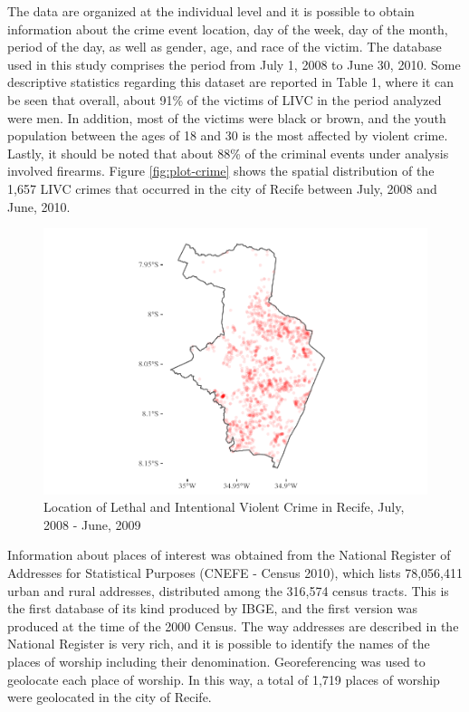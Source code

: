 \documentclass[smallextended]{svjour3}       %
\begin{document}
The data are organized at the individual level and it is possible to
obtain information about the crime event location, day of the week, day
of the month, period of the day, as well as gender, age, and race of the
victim. The database used in this study comprises the period from July
1, 2008 to June 30, 2010. Some descriptive statistics regarding this
dataset are reported in Table 1, where it can be seen that overall,
about 91\% of the victims of LIVC in the period analyzed were men. In
addition, most of the victims were black or brown, and the youth
population between the ages of 18 and 30 is the most affected by violent
crime. Lastly, it should be noted that about 88\% of the criminal events
under analysis involved firearms. Figure \ref{fig:plot-crime} shows the
spatial distribution of the 1,657 LIVC crimes that occurred in the city
of Recife between July, 2008 and June, 2010.

\begin{figure}

\includegraphics{Moral_Communities_and_Crime_files/figure-latex/fig-plot-crime-1} \hfill{}

\caption{\label{fig:plot-crime}Location of Lethal and Intentional Violent Crime in Recife, July, 2008 - June, 2009}\label{fig:fig-plot-crime}
\end{figure}

Information about places of interest was obtained from the National
Register of Addresses for Statistical Purposes (CNEFE - Census 2010),
which lists 78,056,411 urban and rural addresses, distributed among the
316,574 census tracts. This is the first database of its kind produced
by IBGE, and the first version was produced at the time of the 2000
Census. The way addresses are described in the National Register is very
rich, and it is possible to identify the names of the places of worship
including their denomination. Georeferencing was used to geolocate each
place of worship. In this way, a total of 1,719 places of worship were
geolocated in the city of Recife.
\end{document}
